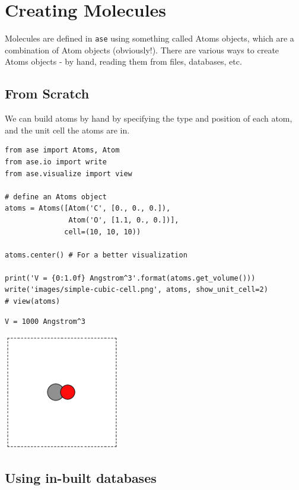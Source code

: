 \documentclass[11pt]{article}
\begin{document}
\section{Creating Molecules}
\label{sec-4}

Molecules are defined in \texttt{ase} using something called Atoms objects, which are a combination of Atom objects (obviously!). There are various ways to create Atoms objects - by hand, reading them from files, databases, etc.

\subsection{From Scratch}
\label{sec-4-1}

We can build atoms by hand by specifying the type and position of each atom, and the unit cell the atoms are in.

\begin{verbatim}
from ase import Atoms, Atom
from ase.io import write
from ase.visualize import view

# define an Atoms object
atoms = Atoms([Atom('C', [0., 0., 0.]),
               Atom('O', [1.1, 0., 0.])],
              cell=(10, 10, 10))

atoms.center() # For a better visualization

print('V = {0:1.0f} Angstrom^3'.format(atoms.get_volume()))
write('images/simple-cubic-cell.png', atoms, show_unit_cell=2)
# view(atoms)
\end{verbatim}

\begin{verbatim}
V = 1000 Angstrom^3
\end{verbatim}

\includegraphics[width=2in]{./images/simple-cubic-cell.png}



\subsection{Using in-built databases}
\label{sec-4-2}
\end{document}
